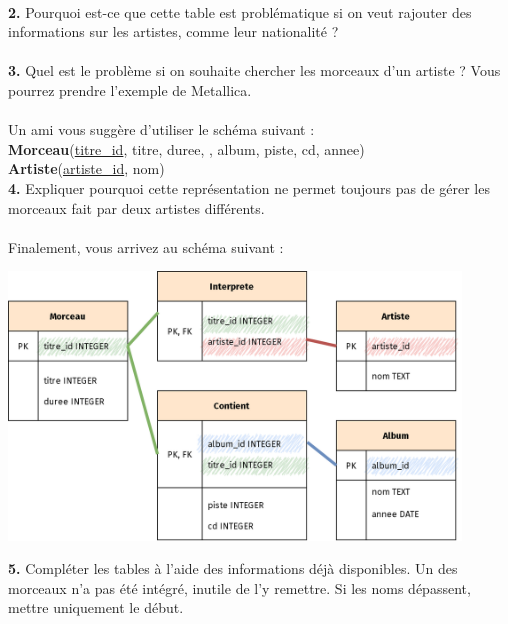 \documentclass[a4paper,10pt,french]{book}
\begin{document}
\\

\textbf{2.} Pourquoi est-ce que cette table est problématique si on veut rajouter des informations sur les artistes, comme leur nationalité ?\\

\\

\textbf{3.} Quel est le problème si on souhaite chercher les morceaux d’un artiste ? Vous pourrez prendre l’exemple de Metallica.\\	

\\
    
    Un ami vous suggère d'utiliser le schéma suivant :\\
    
    \textbf{Morceau}(\uline{titre\_id}, titre, duree, , album, piste, cd, annee)\\
    \textbf{Artiste}(\uline{artiste\_id}, nom)\\
    
    \textbf{4.}	Expliquer pourquoi cette représentation ne permet toujours pas de gérer les morceaux fait par deux artistes différents.	\\
    
\\

    Finalement, vous arrivez au schéma suivant :
    \begin{center}
        \includegraphics[width=12cm]{img/schema}
    \end{center}
    
    \textbf{5.}	Compléter les tables à l’aide des informations déjà disponibles. Un des morceaux n’a pas été intégré, inutile de l'y remettre. Si les noms dépassent, mettre uniquement le début.
    
\end{document}
